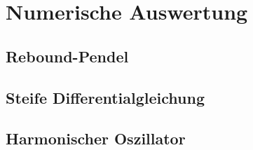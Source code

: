 \section{Numerische Auswertung}

\begin{frame}

\end{frame}

\subsection{Rebound-Pendel}

\begin{frame}

\end{frame}

\subsection{Steife Differentialgleichung}

\begin{frame}

\end{frame}

\subsection{Harmonischer Oszillator}

\begin{frame}

\end{frame}